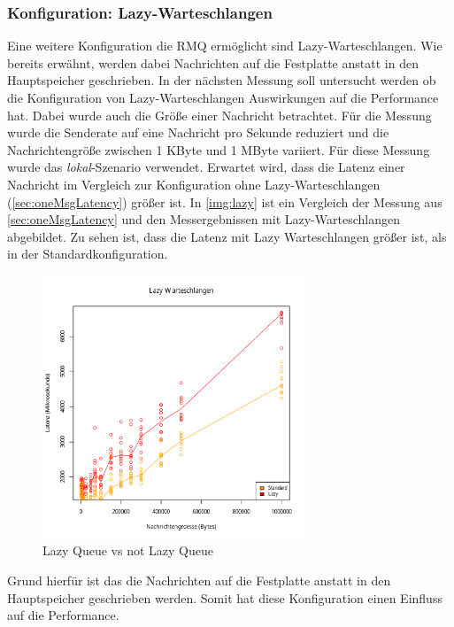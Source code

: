 \subsubsection{Konfiguration: Lazy-Warteschlangen}
\label{sec:rmqLazy}
Eine weitere Konfiguration die RMQ ermöglicht sind Lazy-Warteschlangen. Wie bereits erwähnt, werden dabei Nachrichten auf die Festplatte anstatt in den Hauptspeicher geschrieben. In der nächsten Messung soll untersucht werden ob die Konfiguration von Lazy-Warteschlangen Auswirkungen auf die Performance hat. Dabei wurde auch die Größe einer Nachricht betrachtet. Für die Messung wurde die Senderate auf eine Nachricht pro Sekunde reduziert und die Nachrichtengröße zwischen 1 KByte und 1 MByte variiert. Für diese Messung wurde das \textit{lokal}-Szenario verwendet. Erwartet wird, dass die Latenz einer Nachricht im Vergleich zur Konfiguration ohne Lazy-Warteschlangen (\autoref{sec:oneMsgLatency}) größer ist.
In \autoref{img:lazy} ist ein Vergleich der Messung aus \autoref{sec:oneMsgLatency} und den Messergebnissen mit Lazy-Warteschlangen abgebildet. Zu sehen ist, dass die Latenz mit Lazy Warteschlangen größer ist, als in der Standardkonfiguration.
\begin{figure}
\center
  \includegraphics[width=0.7\textwidth]{images/measurement/lazy-queues.pdf}
  \caption{Lazy Queue vs not Lazy Queue}
  \label{img:lazy}
\end{figure}
Grund hierfür ist das die Nachrichten auf die Festplatte anstatt in den Hauptspeicher geschrieben werden. Somit hat diese Konfiguration einen Einfluss auf die Performance.



